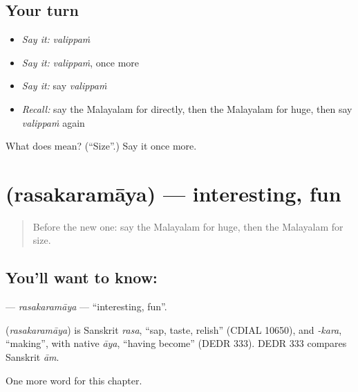 \subsection*{Your turn}
\begin{itemize}
\raggedright
  \item \emph{Say it:} \emph{valippaṁ}
  \item \emph{Say it:} \emph{valippaṁ}, once more
  \item \emph{Say it:} say \emph{valippaṁ}
  \item \emph{Recall:} say the Malayalam for directly, then the Malayalam for huge, then say \emph{valippaṁ} again
\end{itemize}

\begin{tcolorbox}[breakable,colback=teal!4,colframe=teal!35!black,title={Before you move on}]
What does  mean? (\textquotedblleft{}Size\textquotedblright{}.) Say it once more.
\end{tcolorbox}
\section[\texorpdfstring{\ml{രസകരമായ} (rasakaramāya)}{രസകരമായ (rasakaramāya)}]{ (rasakaramāya) — interesting, fun}

\label{lesson:ML-C284-rasakaramaya}



\begin{quote}
Before the new one: say the Malayalam for huge, then the Malayalam for size.
\end{quote}

\subsection*{You'll want to know: }
\textbf{} — \emph{rasakaramāya} — \textquotedblleft{}interesting, fun\textquotedblright{}.

\begin{cousinweb}
\textbf{} (\emph{rasakaramāya}) is Sanskrit \emph{rasa}, \textquotedblleft{}sap, taste, relish\textquotedblright{} (CDIAL 10650), and \emph{-kara}, \textquotedblleft{}making\textquotedblright{}, with native \emph{āya}, \textquotedblleft{}having become\textquotedblright{} (DEDR 333). DEDR 333 compares Sanskrit \emph{ām}.
\end{cousinweb}

\begin{grammarlens}[title={What you've built}]
One more word for this chapter.
\end{grammarlens}

